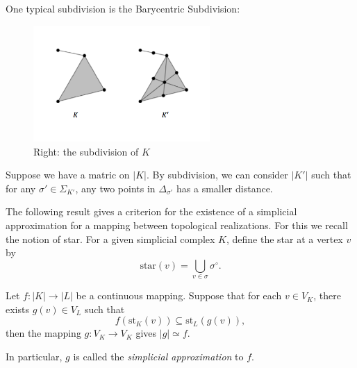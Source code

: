 \begin{example}
One typical subdivision is the Barycentric Subdivision:
\begin{figure}[H]
\centering
\includegraphics[width=0.6\textwidth]{week9/p_9}
\caption{Right: the subdivision of $K$}
\end{figure}
\end{example}
\begin{remark}
Suppose we have a matric on $|K|$.
By subdivision, we can consider $|K'|$ such that for any $\sigma'\in\Sigma_{K'}$, any two points in $\Delta_{\sigma'}$ has a smaller distance.
\end{remark}
The following result gives a criterion for the existence of a simplicial approximation for a mapping between topological realizations.
For this we recall the notion of star.
For a given simplicial complex $K$, define the star at a vertex $v$ by
\[
\text{star}(v)=\bigcup_{v\in\sigma}\sigma^\circ.
\]
\begin{proposition}\label{pro:9:11}
Let $f:|K|\to|L|$ be a continuous mapping.
Suppose that for each $v\in V_K$, there exists $g(v)\in V_L$ such that
\[
f(\text{st}_K(v))\subseteq \text{st}_L(g(v)),
\]
then the mapping $g:V_K\to V_K$ gives $|g|\simeq f$.

In particular, $g$ is called the \emph{simplicial approximation} to $f$.
\end{proposition}
